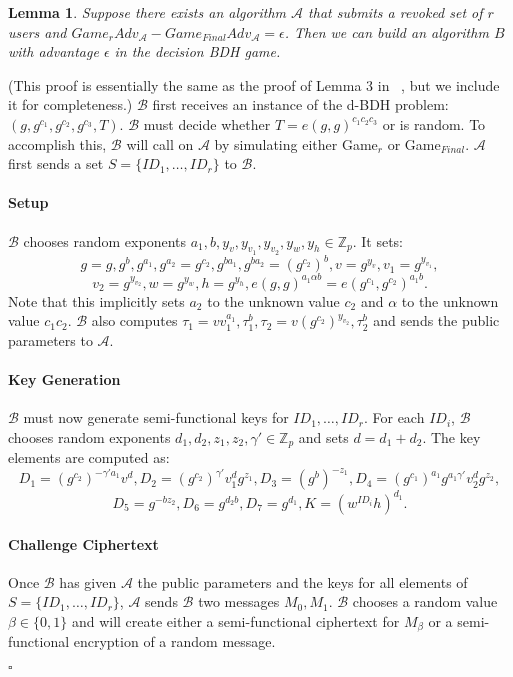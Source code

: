 \documentclass[a4paper, 11pt]{article}
\newtheorem{lemma}[theorem]{Lemma}
\newenvironment{proof}{\par\noindent{\bf Proof.}}{$\square$\par\bigskip}
\newcommand{\Z}{\ensuremath{\mathbb{Z}}}
\newtheorem{lemma}[theorem]{Lemma}
\theoremstyle{definition}
\begin{document}
\begin{lemma} Suppose there exists an algorithm $\mathcal{A}$ that submits a revoked set of $r$ users and $Game_{r}Adv_{\mathcal{A}} - Game_{Final} Adv_{\mathcal{A}} = \epsilon$. Then we can build an algorithm $B$ with advantage $\epsilon$ in the decision BDH game.
\end{lemma}

\begin{proof} (This proof is essentially the same as the proof of Lemma 3 in ~\cite{W09}, but we include it for completeness.) $\mathcal{B}$ first receives an instance of the d-BDH problem: $(g, g^{c_1}, g^{c_2}, g^{c_3}, T)$. $\mathcal{B}$ must decide whether $T = e(g,g)^{c_1 c_2 c_3}$ or is random. To accomplish this, $\mathcal{B}$ will call on $\mathcal{A}$ by simulating either Game$_{r}$ or Game$_{Final}$. $\mathcal{A}$ first sends a set $S = \{ID_1, \ldots, ID_r\}$ to $\mathcal{B}$.

\paragraph{Setup} $\mathcal{B}$ chooses random exponents $a_1, b, y_v, y_{v_1}, y_{v_2}, y_w, y_h \in \Z_p$. It sets:
\[g = g, g^b, g^{a_1}, g^{a_2} = g^{c_2}, g^{b a_1}, g^{ba_2} = (g^{c_2})^b, v = g^{y_v}, v_1 = g^{y_{v_1}},\]
\[ v_2 = g^{y_{v_2}}, w = g^{y_w}, h = g^{y_h}, e(g,g)^{a_1 \alpha b}= e(g^{c_1}, g^{c_2})^{a_1 b}.\]
Note that this implicitly sets $a_2$ to the unknown value $c_2$ and $\alpha$ to the unknown value $c_1 c_2$.
$\mathcal{B}$ also computes $\tau_1 = v v_1^{a_1}, \tau_1^b, \tau_2 = v (g^{c_2})^{y_{v_2}}, \tau_2^b$ and sends the public parameters to $\mathcal{A}$.

\paragraph{Key Generation} $\mathcal{B}$ must now generate semi-functional keys for $ID_1, \ldots, ID_r$. For each $ID_i$, $\mathcal{B}$ chooses random exponents $d_1, d_2, z_1, z_2, \gamma' \in \Z_p$ and sets $d = d_1+d_2$. The key elements are computed as:
\[D_1 = (g^{c_2})^{-\gamma'a_1}v^d, D_2 = (g^{c_2})^{\gamma'}v_1^d g^{z_1}, D_3 = (g^b)^{-z_1}, D_4 = (g^{c_1})^{a_1} g^{a_1\gamma'}v_2^d g^{z_2},\]
\[D_5 = g^{-b z_2}, D_6 = g^{d_2 b}, D_7 = g^{d_1}, K = (w^{ID_i}h)^{d_1}.\]

\paragraph{Challenge Ciphertext} Once $\mathcal{B}$ has given $\mathcal{A}$ the public parameters and the keys for all elements of $S = \{ID_1, \ldots, ID_r\}$, $\mathcal{A}$ sends $\mathcal{B}$ two messages $M_0, M_1$. $\mathcal{B}$ chooses a random value $\beta \in \{0,1\}$ and will create either a semi-functional ciphertext for $M_\beta$ or a semi-functional encryption of a random message.


\end{proof}
\end{document}
